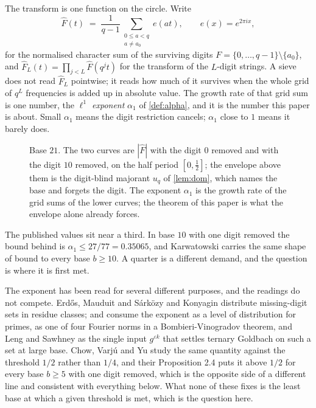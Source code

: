 \documentclass[11pt]{amsart}
\theoremstyle{definition}
\theoremstyle{remark}
\begin{document}
The transform is one function on the circle. Write
\[
  \widehat{F}(t) \;=\; \frac{1}{q-1}\sum_{\substack{0 \le a < q \\ a \ne a_{0}}} e(a t), \qquad e(x) = e^{2\pi i x},
\]
for the normalised character sum of the surviving digits $F = \{0, \dots, q-1\} \setminus \{a_{0}\}$, and $\widehat{F}_{L}(t) = \prod_{j<L} \widehat{F}(q^{j} t)$ for the transform of the $L$-digit strings. A sieve does not read $\widehat{F}_{L}$ pointwise; it reads how much of it survives when the whole grid of $q^{L}$ frequencies is added up in absolute value. The growth rate of that grid sum is one number, the \emph{$\ell^{1}$ exponent} $\alpha_{1}$ of \cref{def:alpha}, and it is the number this paper is about. Small $\alpha_{1}$ means the digit restriction cancels; $\alpha_{1}$ close to $1$ means it barely does.

\begin{figure}[t]
\centering

\caption{Base $21$. The two curves are $|\widehat{F}|$ with the digit $0$ removed and with the digit $10$ removed, on the half period $[0, \tfrac12]$; the envelope above them is the digit-blind majorant $u_{q}$ of \cref{lem:dom}, which names the base and forgets the digit. The exponent $\alpha_{1}$ is the growth rate of the grid sums of the lower curves; the theorem of this paper is what the envelope alone already forces.}
\label{fig:lemma}
\end{figure}

The published values sit near a third. In base $10$ with one digit removed the bound behind \cite{may} is $\alpha_{1} \le 27/77 = 0.35065$, and Karwatowski \cite{kar} carries the same shape of bound to every base $b \ge 10$. A quarter is a different demand, and the question is where it is first met.

The exponent has been read for several different purposes, and the readings do not compete. Erd\H{o}s, Mauduit and S\'ark\"ozy \cite{ems} and Konyagin \cite{kon} distribute missing-digit sets in residue classes; \cite{may} and \cite{may22} consume the exponent as a level of distribution for primes, \cite{nath} as one of four Fourier norms in a Bombieri-Vinogradov theorem, and Leng and Sawhney \cite{ls} as the single input $g^{\varepsilon k}$ that settles ternary Goldbach on such a set at large base. Chow, Varj\'u and Yu \cite{cvy} study the same quantity against the threshold $1/2$ rather than $1/4$, and their Proposition 2.4 puts it above $1/2$ for every base $b \ge 5$ with one digit removed, which is the opposite side of a different line and consistent with everything below. What none of these fixes is the least base at which a given threshold is met, which is the question here.
\end{document}
